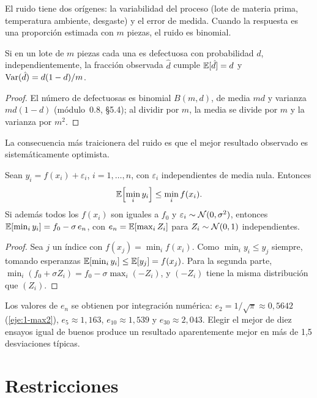 El ruido tiene dos orígenes: la variabilidad del proceso (lote de materia prima, temperatura ambiente, desgaste) y el error de medida. Cuando la respuesta es una proporción estimada con $m$ piezas, el ruido es binomial.

\begin{proposicion}\label{prop:binomial}
Si en un lote de $m$ piezas cada una es defectuosa con probabilidad $d$, independientemente, la fracción observada $\hat d$ cumple $\mathbb{E}[\hat d]=d$ y $\operatorname{Var}(\hat d)=d(1-d)/m$.
\end{proposicion}

\begin{proof}
El número de defectuosas es binomial $B(m,d)$, de media $md$ y varianza $md(1-d)$ (módulo~0.8, §5.4); al dividir por $m$, la media se divide por $m$ y la varianza por $m^{2}$.
\end{proof}

La consecuencia más traicionera del ruido es que el mejor resultado observado es sistemáticamente optimista.

\begin{proposicion}\label{prop:ganador}
Sean $y_i=f(x_i)+\varepsilon_i$, $i=1,\dots,n$, con $\varepsilon_i$ independientes de media nula. Entonces
\[
\mathbb{E}\Bigl[\min_{i}y_i\Bigr]\le\min_{i}f(x_i).
\]
Si además todos los $f(x_i)$ son iguales a $f_0$ y $\varepsilon_i\sim\mathcal{N}(0,\sigma^2)$, entonces $\mathbb{E}[\min_i y_i]=f_0-\sigma\,e_n$, con $e_n=\mathbb{E}[\max_i Z_i]$ para $Z_i\sim\mathcal{N}(0,1)$ independientes.
\end{proposicion}

\begin{proof}
Sea $j$ un índice con $f(x_j)=\min_i f(x_i)$. Como $\min_i y_i\le y_j$ siempre, tomando esperanzas $\mathbb{E}[\min_i y_i]\le\mathbb{E}[y_j]=f(x_j)$. Para la segunda parte, $\min_i(f_0+\sigma Z_i)=f_0-\sigma\max_i(-Z_i)$, y $(-Z_i)$ tiene la misma distribución que $(Z_i)$.
\end{proof}

Los valores de $e_n$ se obtienen por integración numérica: $e_2=1/\sqrt\pi\approx 0{,}5642$ (\cref{eje:1-max2}), $e_5\approx 1{,}163$, $e_{10}\approx 1{,}539$ y $e_{30}\approx 2{,}043$. Elegir el mejor de diez ensayos igual de buenos produce un resultado aparentemente mejor en más de 1,5 desviaciones típicas.

\section{Restricciones}

